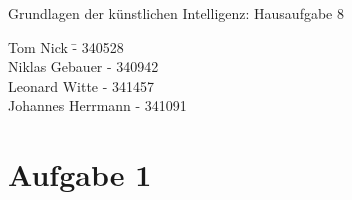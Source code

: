 \documentclass[a4paper,10pt]{article}
\begin{document}
\begin{center}
\Large{Grundlagen der künstlichen Intelligenz: Hausaufgabe 8} \\
\end{center}
\begin{tabbing}
Tom Nick \hspace{2cm}\= - 340528\\
Niklas Gebauer \> - 340942 \\
Leonard Witte \> - 341457 \\
Johannes Herrmann \> - 341091\\
\end{tabbing}

\section*{Aufgabe 1}
\end{document}

